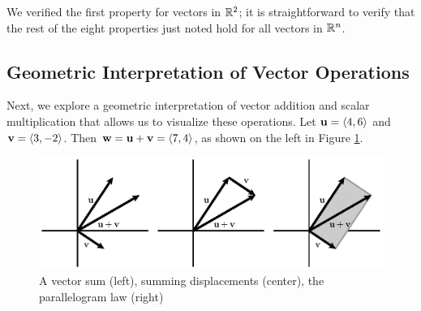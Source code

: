 \vspace*{5pt}
\nin {}
\vspace*{5pt}

We verified the first property for vectors in $\mathbb{R}^2$; it is
straightforward to verify that the rest of the eight properties just
noted hold for all 
vectors in $\mathbb{R}^n$. 

\subsection*{Geometric Interpretation of Vector Operations}

Next, we explore a geometric interpretation of vector addition and
scalar multiplication that allows us to visualize these operations.
Let $\mathbf{u} = \langle 4, 6 \rangle$ and $\mathbf{v} = \langle 3, -2
\rangle$. Then $\mathbf{w} = \mathbf{u} + \mathbf{v} = \langle 7, 4 \rangle$, as shown on the left in
Figure \ref{F:9.2.vector_sum}.

\begin{figure}[ht]
  \begin{center}
    \includegraphics{figures/fig_9_2_operations.eps}
  \caption{A vector sum (left), summing displacements (center), the parallelogram law (right)}
  \label{F:9.2.vector_sum}
  \end{center}
\end{figure}

